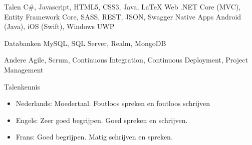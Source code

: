 


\begin{cvskills}


\cvskill
{Talen}
{C\#, Javascript, HTML5, CSS3, Java, LaTeX}
\cvskill
{Web}
{.NET Core (MVC), Entity Framework Core, SASS, REST, JSON, Swagger}
\cvskill
{Native Apps}
{Android (Java), iOS (Swift), Windows UWP}

\cvskill
{Databanken}
{MySQL, SQL Server, Realm, MongoDB}

\cvskill
{Andere}
{Agile, Scrum, Continuous Integration, Continuous Deployment, Project Management}

\cvskill
{Talenkennis} %
{
\begin{itemize}
\item {Nederlands: Moedertaal. Foutloos spreken en foutloos schrijven }
\item Engels: Zeer goed begrijpen. Goed spreken en schrijven.
\item Frans: Goed begrijpen. Matig schrijven en spreken.
\end{itemize}
} %


\end{cvskills}